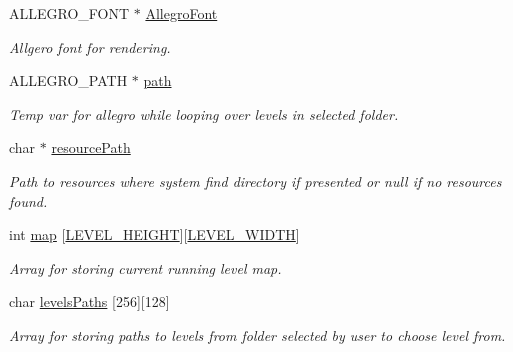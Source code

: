 \begin{DoxyCompactItemize}
A\+L\+L\+E\+G\+R\+O\+\_\+\+F\+O\+NT $\ast$ \hyperlink{group___library_merger_ga18d30843d40a57148bbfacc9cf1ef055}{Allegro\+Font}
\begin{DoxyCompactList}\small\item\em Allgero font for rendering. \end{DoxyCompactList}\item 
\mbox{\label{group___library_merger_ga79bd92474fc256263841144176127d9b}} 
A\+L\+L\+E\+G\+R\+O\+\_\+\+P\+A\+TH $\ast$ \hyperlink{group___library_merger_ga79bd92474fc256263841144176127d9b}{path}
\begin{DoxyCompactList}\small\item\em Temp var for allegro while looping over levels in selected folder. \end{DoxyCompactList}\item 
\mbox{\label{group___library_merger_gabdcd64f05e152660b88aa7beefcd2b09}} 
char $\ast$ \hyperlink{group___library_merger_gabdcd64f05e152660b88aa7beefcd2b09}{resource\+Path}
\begin{DoxyCompactList}\small\item\em Path to resources where system find directory if presented or null if no resources found. \end{DoxyCompactList}\item 
\mbox{\label{group___library_merger_gaf3cf0ba525aea0327b3c3512df21094a}} 
int \hyperlink{group___library_merger_gaf3cf0ba525aea0327b3c3512df21094a}{map} \mbox{[}\hyperlink{group___library_merger_ga16621561d55e77faa59fbfdae692916f}{L\+E\+V\+E\+L\+\_\+\+H\+E\+I\+G\+HT}\mbox{]}\mbox{[}\hyperlink{group___library_merger_ga219cc98394ab36a78470c0627c4f8464}{L\+E\+V\+E\+L\+\_\+\+W\+I\+D\+TH}\mbox{]}
\begin{DoxyCompactList}\small\item\em Array for storing current running level map. \end{DoxyCompactList}\item 
\mbox{\label{group___library_merger_ga5a00f62db43aff74971290ceba5fa7df}} 
char \hyperlink{group___library_merger_ga5a00f62db43aff74971290ceba5fa7df}{levels\+Paths} \mbox{[}256\mbox{]}\mbox{[}128\mbox{]}
\begin{DoxyCompactList}\small\item\em Array for storing paths to levels from folder selected by user to choose level from. \end{DoxyCompactList}\item 

\end{DoxyCompactItemize}
